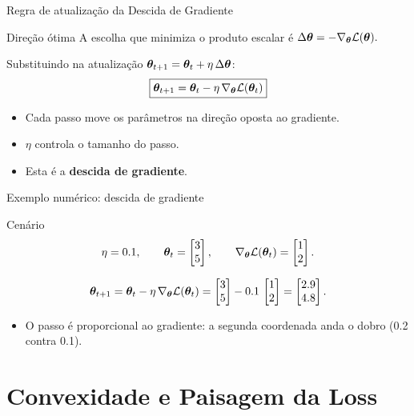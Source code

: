 \documentclass[aspectratio=169,xcolor=dvipsnames]{beamer}
\begin{document}
  \begin{frame}{Regra de atualização da Descida de Gradiente}
    \begin{block}{Direção ótima}
      A escolha que minimiza o produto escalar é
      \(
        \Delta\bm{\theta} = -\nabla_{\bm{\theta}}\mathcal{L}(\bm{\theta}).
      \)
    \end{block}
    \vfill
    Substituindo na atualização $\bm{\theta}_{t+1}=\bm{\theta}_{t}+\eta\,\Delta\bm{\theta}$:
    \[
      \boxed{\bm{\theta}_{t+1}=\bm{\theta}_{t}-\eta\,\nabla_{\bm{\theta}}\mathcal{L}(\bm{\theta}_{t})}
    \]
    \vfill
    \begin{itemize}
      \item Cada passo move os parâmetros na direção oposta ao gradiente.
      \item $\eta$ controla o tamanho do passo.
      \item Esta é a \textbf{descida de gradiente}.
    \end{itemize}
  \end{frame}

  \begin{frame}{Exemplo numérico: descida de gradiente}
    \begin{block}{Cenário}
      \[
        \eta = 0.1,\qquad \bm{\theta}_t = \begin{bmatrix} 3 \\ 5 \end{bmatrix},\qquad
        \nabla_{\bm{\theta}}\mathcal{L}(\bm{\theta}_t) = \begin{bmatrix} 1 \\ 2 \end{bmatrix}.
      \]
    \end{block}
    \[
      \bm{\theta}_{t+1} = \bm{\theta}_t - \eta\,\nabla_{\bm{\theta}}\mathcal{L}(\bm{\theta}_t)
      = \begin{bmatrix} 3 \\ 5 \end{bmatrix} - 0.1\,\begin{bmatrix} 1 \\ 2 \end{bmatrix} = \begin{bmatrix} 2.9 \\ 4.8 \end{bmatrix}.
    \]
    \begin{itemize}
      \item O passo é proporcional ao gradiente: a segunda coordenada anda o dobro (0.2 contra 0.1).
    \end{itemize}
  \end{frame}

  \section{Convexidade e Paisagem da Loss}
\end{document}
